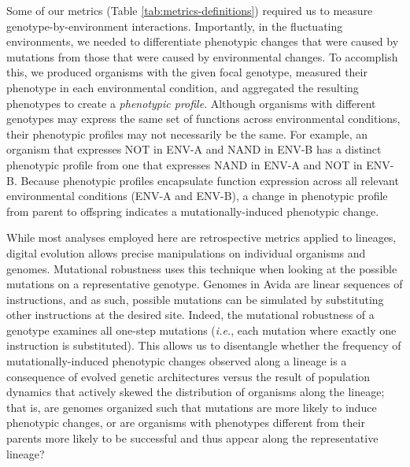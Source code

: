 \documentclass[utf8]{frontiersSCNS} %
\begin{document}
\begin{raggedbottom}

Some of our metrics (Table \ref{tab:metrics-definitions}) required us to measure genotype-by-environment interactions.
Importantly, in the fluctuating environments, we needed to differentiate phenotypic changes that were caused by mutations from those that were caused by environmental changes.
To accomplish this, we produced organisms with the given focal genotype, measured their phenotype in each environmental condition, and aggregated the resulting phenotypes to create a \textit{phenotypic profile}.
Although organisms with different genotypes may express the same set of functions across environmental conditions, their phenotypic profiles may not necessarily be the same.
For example, an organism that expresses NOT in ENV-A and NAND in ENV-B has a distinct phenotypic profile from one that expresses NAND in ENV-A and NOT in ENV-B.
Because phenotypic profiles encapsulate function expression across all relevant environmental conditions (ENV-A and ENV-B), a change in phenotypic profile from parent to offspring indicates a mutationally-induced phenotypic change.  

While most analyses employed here are retrospective metrics applied to lineages, digital evolution allows precise manipulations on individual organisms and genomes.
Mutational robustness uses this technique when looking at the possible mutations on a representative genotype.
Genomes in Avida are linear sequences of instructions, and as such, possible mutations can be simulated by substituting other instructions at the desired site.
Indeed, the mutational robustness of a genotype examines all one-step mutations (\textit{i.e.}, each mutation where exactly one instruction is substituted).
This allows us to disentangle whether the frequency of mutationally-induced phenotypic changes observed along a lineage is a consequence of evolved genetic architectures versus the result of population dynamics that actively skewed the distribution of organisms along the lineage; that is, are genomes organized such that mutations are more likely to induce phenotypic changes, or are organisms with phenotypes different from their parents more likely to be successful and thus appear along the representative lineage?


\end{raggedbottom}
\end{document}
